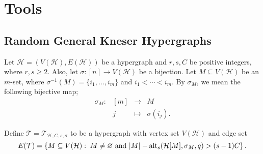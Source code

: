 \documentclass[11pt]{amsart}
\theoremstyle{definition}
\theoremstyle{remark}
\def\T{\mathsf{T}}
\def\T{\mathcal{T}}
\begin{document}
\section{Tools}\label{tools}
\subsection{\bf Random General Kneser Hypergraphs}
Let $\mathcal{H}=(V(\mathcal{H}),E(\mathcal{H}))$ be a hypergraph and $r, s, C$ be positive integers, where $r,s\geq 2$. 
Also, let $\sigma:[n]\longrightarrow V(\mathcal{H})$ be a bijection.
Let $M\subseteq V(\mathcal{H})$ be an $m$-set, where 
$\sigma^{-1}(M)=\{i_1,\ldots,i_m\}$ and $i_1<\cdots<i_m$. By $\sigma_M$, we mean the following bijective map; 
$$\begin{array}{lcll}
\sigma_M: & [m] & \longrightarrow & M\\
& j &\longmapsto &\sigma(i_j).
\end{array}$$

Define $\T=\T_{\mathcal{H},C,s,\sigma}$ to be a hypergraph with vertex set $V(\mathcal{H})$ and edge set
$$E(\T)=\left\{M\subseteq V(\mathcal{H}):\; M\neq\varnothing \mbox{ and } |M|-{\rm alt}_s(\mathcal{H}[M],\sigma_M,q) > (s-1)C\right\}.$$
\end{document}
